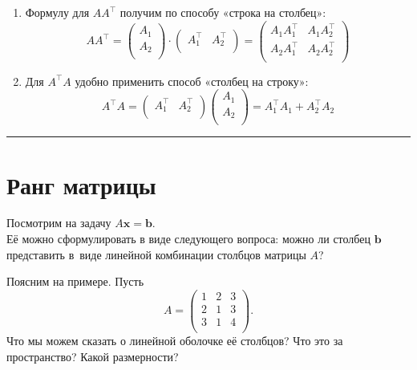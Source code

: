 \documentclass[11pt,a4paper]{article}
\renewcommand{\linethickness}{0.1ex}
\providecommand{\tightlist}{%
      \setlength{\itemsep}{0pt}\setlength{\parskip}{0pt}}
\begin{document}
\begin{enumerate}
\def\labelenumi{\arabic{enumi}.}
\tightlist
\item
  Формулу для \(A A^\top\) получим по способу «строка на столбец»: \[
    A A^\top =
    \begin{pmatrix}
   A_1 \\
   A_2 \\
    \end{pmatrix}
    \cdot
    \begin{pmatrix}
   A_1^\top & A_2^\top \\
    \end{pmatrix}
    =
    \begin{pmatrix}
   A_1 A_1^\top & A_1 A_2^\top \\
   A_2 A_1^\top & A_2 A_2^\top \\
    \end{pmatrix}
  \]
\item
  Для \(A^\top A\) удобно применить способ «столбец на строку»: \[
    A^\top A =
    \begin{pmatrix}
   A_1^\top & A_2^\top \\
    \end{pmatrix}
    \begin{pmatrix}
   A_1 \\
   A_2 \\
    \end{pmatrix}
    = A_1^\top A_1 + A_2^\top A_2
  \]
\end{enumerate}

    \begin{center}\rule{0.5\linewidth}{\linethickness}\end{center}

    \hypertarget{ux440ux430ux43dux433-ux43cux430ux442ux440ux438ux446ux44b}{%
\section{Ранг
матрицы}\label{ux440ux430ux43dux433-ux43cux430ux442ux440ux438ux446ux44b}}

Посмотрим на задачу \(A \mathbf{x} = \mathbf{b}\).\\
Её можно сформулировать в виде следующего вопроса: можно ли столбец \(\mathbf{b}\) представить в~виде линейной комбинации столбцов матрицы
\(A\)?

Поясним на примере. Пусть \[
  A =
  \begin{pmatrix}
     1 & 2 & 3 \\
     2 & 1 & 3 \\
     3 & 1 & 4 \\
  \end{pmatrix}.
\] Что мы можем сказать о линейной оболочке её столбцов? Что это за
пространство? Какой размерности?
\end{document}
